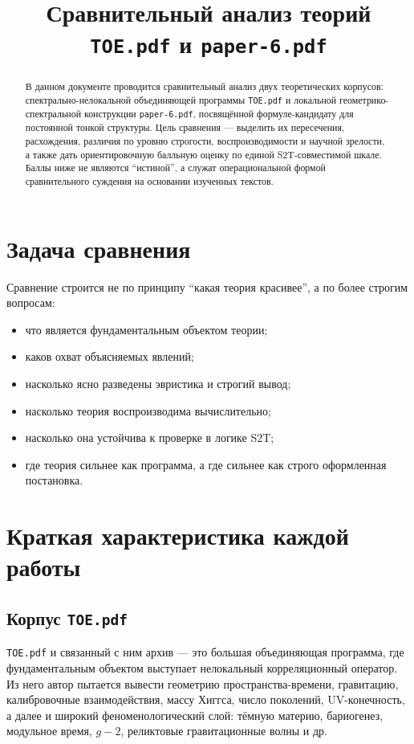 \documentclass[12pt,a4paper]{article}
\title{Сравнительный анализ теорий \texttt{TOE.pdf} и \texttt{paper-6.pdf}}
\author{}
\date{}
\begin{document}
\maketitle

\begin{abstract}
В данном документе проводится сравнительный анализ двух теоретических корпусов: спектрально-нелокальной объединяющей программы \texttt{TOE.pdf} и локальной геометрико-спектральной конструкции \texttt{paper-6.pdf}, посвящённой формуле-кандидату для постоянной тонкой структуры. Цель сравнения --- выделить их пересечения, расхождения, различия по уровню строгости, воспроизводимости и научной зрелости, а также дать ориентировочную балльную оценку по единой S2T-совместимой шкале. Баллы ниже не являются ``истиной'', а служат операциональной формой сравнительного суждения на основании изученных текстов.
\end{abstract}

\section{Задача сравнения}

Сравнение строится не по принципу ``какая теория красивее'', а по более строгим вопросам:
\begin{itemize}
    \item что является фундаментальным объектом теории;
    \item каков охват объясняемых явлений;
    \item насколько ясно разведены эвристика и строгий вывод;
    \item насколько теория воспроизводима вычислительно;
    \item насколько она устойчива к проверке в логике S2T;
    \item где теория сильнее как программа, а где сильнее как строго оформленная постановка.
\end{itemize}

\section{Краткая характеристика каждой работы}

\subsection{Корпус \texttt{TOE.pdf}}

\texttt{TOE.pdf} и связанный с ним архив --- это большая объединяющая программа, где фундаментальным объектом выступает нелокальный корреляционный оператор. Из него автор пытается вывести геометрию пространства-времени, гравитацию, калибровочные взаимодействия, массу Хиггса, число поколений, UV-конечность, а далее и широкий феноменологический слой: тёмную материю, бариогенез, модульное время, \(g-2\), реликтовые гравитационные волны и др.
\end{document}
